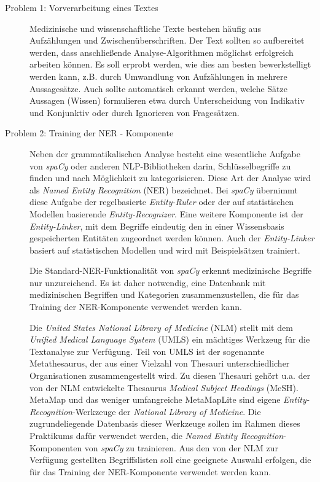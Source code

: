 \begin{description}

\item[Problem 1: Vorverarbeitung eines Textes] Medizinische und wissenschaftliche Texte bestehen häufig aus Aufzählungen und Zwischenüberschriften. Der Text sollten so aufbereitet werden, dass anschließende Analyse-Algorithmen möglichst erfolgreich arbeiten können. Es soll erprobt werden, wie dies am besten bewerkstelligt werden kann, z.B. durch Umwandlung von Aufzählungen in mehrere Aussagesätze. Auch sollte automatisch erkannt werden, welche Sätze Aussagen (Wissen) formulieren etwa durch Unterscheidung von Indikativ und Konjunktiv oder durch Ignorieren von Fragesätzen. 

\item[Problem 2: Training der NER - Komponente] Neben der grammatikalischen Analyse besteht eine wesentliche Aufgabe von \emph{spaCy} oder anderen NLP-Bibliotheken darin, Schlüsselbegriffe zu finden und nach Möglichkeit zu kategorisieren. Diese Art der Analyse wird als \emph{Named Entity Recognition} (NER) bezeichnet. Bei \emph{spaCy} übernimmt diese Aufgabe der regelbasierte \emph{Entity-Ruler} oder der auf statistischen Modellen basierende \emph{Entity-Recognizer}. Eine weitere Komponente ist der \emph{Entity-Linker}, mit dem Begriffe eindeutig den in einer Wissensbasis gespeicherten Entitäten zugeordnet werden können. Auch der \emph{Entity-Linker} basiert auf statistischen Modellen und wird mit Beispielsätzen trainiert.

Die Standard-NER-Funktionalität von \emph{spaCy} erkennt medizinische Begriffe nur unzureichend. Es ist daher notwendig, eine Datenbank mit medizinischen Begriffen und Kategorien zusammenzustellen, die für das Training der NER-Komponente verwendet werden kann.

Die \emph{United States National Library of Medicine} (NLM) stellt mit dem \emph{Unified Medical Language System} (UMLS) ein mächtiges Werkzeug für die Textanalyse zur Verfügung. Teil von UMLS ist der sogenannte Metathesaurus, der aus einer Vielzahl von Thesauri unterschiedlicher Organisationen zusammengestellt wird. Zu diesen Thesauri gehört u.a. der von der NLM entwickelte Thesaurus \emph{Medical Subject Headings} (MeSH). MetaMap und das weniger umfangreiche MetaMapLite sind eigene \emph{Entity-Recognition}-Werkzeuge der \emph{National Library of Medicine}. Die zugrundeliegende Datenbasis dieser Werkzeuge sollen im Rahmen dieses Praktikums dafür verwendet werden, die \emph{Named Entity Recognition}-Komponenten von \emph{spaCy} zu trainieren. Aus den von der NLM zur Verfügung gestellten Begriffslisten soll eine geeignete Auswahl erfolgen, die für das Training der NER-Komponente verwendet werden kann.


\end{description}
